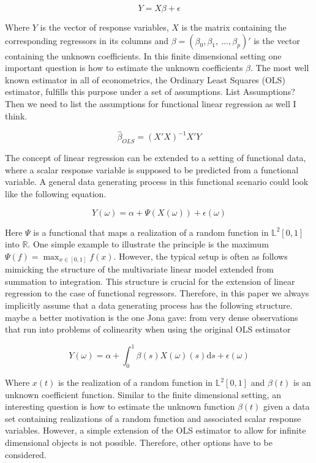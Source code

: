 \documentclass[11pt,twoside,a4paper]{article}
\begin{document}
	\begin{equation}
		Y = X\beta + \epsilon
	\end{equation}
	
	Where $Y$ is the vector of response variables, $X$ is the matrix containing the corresponding regressors in its columns and $\beta = (\beta_0, \beta_1, \: \dots, \beta_p)'$ is the vector containing the unknown coefficients.
	In this finite dimensional setting one important question is how to estimate the unknown coefficients $\beta$. The most well known estimator in all of econometrics, the Ordinary Least Squares (OLS) estimator, fulfills this purpose under a set of assumptions. {\color{red}List Assumptions? Then we need to list the assumptions for functional linear regression as well I think.}
	
	\begin{equation}
		\hat{\beta}_{OLS} = (X'X)^{-1}X'Y
	\end{equation}
	
	The concept of linear regression can be extended to a setting of functional data, where a scalar response variable is supposed to be predicted from a functional variable. 
	A general data generating process in this functional scenario could look like the following equation.
	
	\begin{equation}
		Y(\omega) = \alpha + \Psi\left(X(\omega)\right) + \epsilon(\omega)
	\end{equation}
	
	Here $\Psi$ is a functional that maps a realization of a random function in $\mathbb{L}^2[0,1]$ into $\mathbb{R}$. One simple example to illustrate the principle is the maximum $\Psi(f) = \max_{x \in [0,1]}f(x)$.
	However, the typical setup is often as follows mimicking the structure of the multivariate linear model extended from summation to integration. This structure is crucial for the extension of linear regression to the case of functional regressors. Therefore, in this paper we always implicitly assume that a data generating process has the following structure. {\color{red} maybe a better motivation is the one Jona gave: from very dense observations that run into problems of colinearity when using the original OLS estimator}
	
	\begin{equation}\label{DGP}
		Y(\omega) = \alpha + \int_{0}^{1} \beta(s)X(\omega)(s) \mathrm{d}s + \epsilon(\omega)
	\end{equation}
	
	Where $x(t)$ is the realization of a random function in $\mathbb{L}^2[0,1]$ and $\beta(t)$ is an unknown coefficient function. 
	Similar to the finite dimensional setting, an interesting question is how to estimate the unknown function $\beta(t)$ given a data set containing realizations of a random function and associated scalar response variables. However, a simple extension of the OLS estimator to allow for infinite dimensional objects is not possible. Therefore, other options have to be considered.
	
\end{document}
